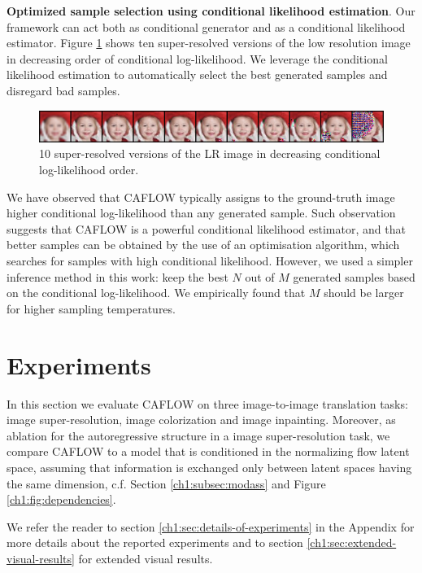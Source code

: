 \smallskip

\textbf{Optimized sample selection using conditional likelihood estimation}. \color{black}Our framework can act both as conditional generator and as a conditional likelihood estimator. Figure \ref{ch1:fig:decreasingloglikelihood} shows ten super-resolved versions of the low resolution image in decreasing order of conditional log-likelihood. We leverage the conditional likelihood estimation to automatically select the best generated samples and disregard bad samples. 

\begin{figure}[h!]
    \centering
    \includegraphics[width=\textwidth]{Chapter1/paper_graphs/10samples_decreasing_conditional_loglikelihood.png}
    \caption{10 super-resolved versions of the LR image in decreasing conditional log-likelihood order.}
    \label{ch1:fig:decreasingloglikelihood}
\end{figure}

We have observed that CAFLOW typically assigns to the ground-truth image higher conditional log-likelihood than any generated sample. Such observation suggests that CAFLOW is a powerful conditional likelihood estimator, and that better samples can be obtained by the use of an optimisation algorithm, which searches for samples with high conditional likelihood. However, we used a simpler inference method in this work: keep the best $N$ out of $M$ generated samples based on the conditional log-likelihood. We empirically found that $M$ should be larger for higher sampling temperatures.

\section{Experiments}\label{ch1:sec:numerics}
In this section we evaluate CAFLOW on three image-to-image translation tasks: image super-resolution, image colorization and image inpainting. Moreover, as ablation for the autoregressive structure in a image super-resolution task, we compare CAFLOW to a model that is conditioned in the normalizing flow latent space, assuming that information is exchanged only between latent spaces having the same dimension, c.f. Section \ref{ch1:subsec:modass} and Figure \ref{ch1:fig:dependencies}. 

We refer the reader to section \ref{ch1:sec:details-of-experiments} in the Appendix for more details about the reported experiments and to section \ref{ch1:sec:extended-visual-results} for extended visual results.

